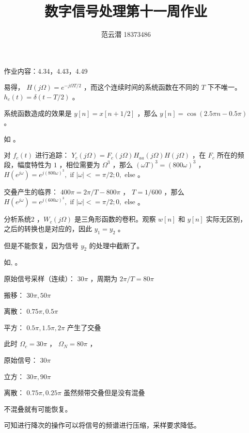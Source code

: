 \documentclass[lang=cn,11pt,a4paper,cite=authoryear,twocolumn]{elegantpaper}
\title{数字信号处理\quad 第十一周作业}
\author{范云潜 18373486}
\institute{微电子学院 184111 班}
\date{\zhtoday}
\begin{document}
\maketitle

作业内容：4.34，4.43，4.49 




易得， \(H(j\Omega) = e^{-j\Omega T / 2}\) ，而这个连续时间的系统函数在不同的 \(T\) 下不唯一。 \(h_c(t) = \delta(t-T/2)\) 。


系统函数造成的效果是 \(y[n] = x[n+1/2]\) ，那么 \(y[n] = \cos (2.5 \pi n - 0.5 \pi )\) 。

如 。






对 \(f_c(t) \) 进行追踪： \(Y_c(j\Omega) = F_c(j\Omega) H_{aa}(j \Omega) H(j\Omega) \) ，在 \(F_c\) 所在的频段，幅度特性为 \(1\) ，相位需要为 \(\Omega^3 \) ，那么 \((\omega T)^3 = (800 \omega)^3\) ， \(H(e^{j\omega}) = e^{j(800 \omega)^3}, \text{ if } |\omega| <= \pi / 2; 0, \text{ else}\) 。


交叠产生的临界： \(400 \pi = 2\pi / T - 800 \pi \) ， \(T = 1/600 \) ，那么  \(H(e^{j\omega}) = e^{j(600 \omega)^3}, \text{ if } |\omega| <= \pi / 2; 0, \text{ else}\) 。




分析系统2 ，\(W_c(j\Omega)\) 是三角形函数的卷积。观察 \(w[n]\) 和 \(y[n]\) 实际无区别，之后的转换也是对应的，因此 \(y_1 = y_2\) 。

但是不能恢复，因为信号 \(y_2\) 的处理中截断了。

如, 。




原始信号采样（连续）： \(30 \pi\) ，周期为 \(2\pi / T = 80 \pi\)

搬移： \(30 \pi, 50 \pi\) 

离散： \(0.75 \pi, 0.5\pi\)

平方： \(0.5 \pi, 1.5\pi, 2\pi\) 产生了交叠


此时 \(\Omega_c = 30 \pi\) ， \(\Omega_N = 80 \pi\) ，

原始信号： \(30 \pi\)  

立方： \(30\pi, 90\pi\)

离散： \(0.75 \pi, 0.25\pi\) 虽然频带交叠但是没有混叠

不混叠就有可能恢复。


可知进行降次的操作可以将信号的频谱进行压缩，采样要求降低。


\end{document}
